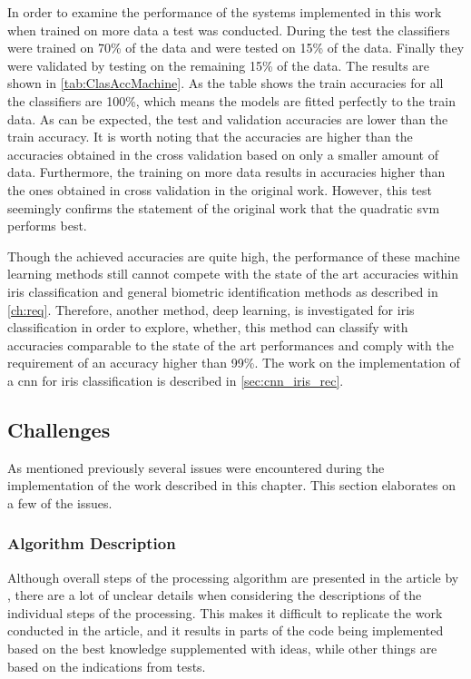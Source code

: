 In order to examine the performance of the systems implemented in this work when trained on more data a test was conducted. During the test the classifiers were trained on 70\% of the data and were tested on 15\% of the data. Finally they were validated by testing on the remaining 15\% of the data. The results are shown in \autoref{tab:ClasAccMachine}. As the table shows the train accuracies for all the classifiers are 100\%, which means the models are fitted perfectly to the train data. As can be expected, the test and validation accuracies are lower than the train accuracy. It is worth noting that the accuracies are higher than the accuracies obtained in the cross validation based on only a smaller amount of data. Furthermore, the training on more data results in accuracies higher than the ones obtained in cross validation in the original work. However, this test seemingly confirms the statement of the original work that the quadratic \gls{svm} performs best.

Though the achieved accuracies are quite high, the performance of these machine learning methods still cannot compete with the state of the art accuracies within iris classification and general biometric identification methods as described in \autoref{ch:req}. Therefore, another method, deep learning, is investigated for iris classification in order to explore, whether, this method can classify with accuracies comparable to the state of the art performances and comply with the requirement of an accuracy higher than 99\%. The work on the implementation of a \gls{cnn} for iris classification is described in \autoref{sec:cnn_iris_rec}.

\subsection{Challenges}
\label{sec:ChallDatabase}
As mentioned previously several issues were encountered during the implementation of the work described in this chapter. This section elaborates on a few of the issues. 

\subsubsection{Algorithm Description} 
Although overall steps of the processing algorithm are presented in the article by \cite{Khan2017a}, there are a lot of unclear details when considering the descriptions of the individual steps of the processing. This makes it difficult to replicate the work conducted in the article, and it results in parts of the code being implemented based on the best knowledge supplemented with ideas, while other things are based on the indications from tests.

